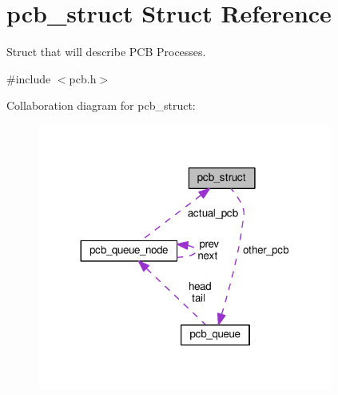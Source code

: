 \hypertarget{structpcb__struct}{}\section{pcb\+\_\+struct Struct Reference}
\label{structpcb__struct}


Struct that will describe P\+CB Processes.  




{\ttfamily \#include $<$pcb.\+h$>$}



Collaboration diagram for pcb\+\_\+struct\+:\nopagebreak
\begin{figure}[H]
\begin{center}
\leavevmode
\includegraphics[width=275pt]{structpcb__struct__coll__graph}
\end{center}
\end{figure}
